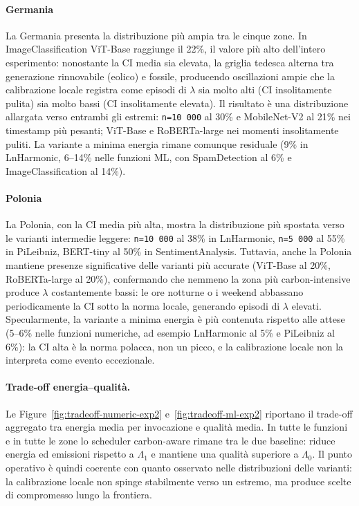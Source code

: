 \paragraph{Germania}
La Germania presenta la distribuzione più ampia tra le cinque zone. In
ImageClassification ViT-Base raggiunge il 22\%, il valore più alto dell'intero
esperimento: nonostante la CI media sia elevata, la griglia tedesca alterna tra
generazione rinnovabile (eolico) e fossile, producendo oscillazioni ampie che la
calibrazione locale registra come episodi di $\lambda$ sia molto alti (CI
insolitamente pulita) sia molto bassi (CI insolitamente elevata). Il risultato è
una distribuzione allargata verso entrambi gli estremi: \texttt{n=10\,000} al
30\% e MobileNet-V2 al 21\% nei timestamp più pesanti; ViT-Base e RoBERTa-large
nei momenti insolitamente puliti. La variante a minima energia rimane comunque
residuale (9\% in LnHarmonic, 6--14\% nelle funzioni ML, con SpamDetection al
6\% e ImageClassification al 14\%).

\paragraph{Polonia}
La Polonia, con la CI media più alta, mostra la distribuzione più
spostata verso le varianti intermedie leggere: \texttt{n=10\,000} al 38\% in
LnHarmonic, \texttt{n=5\,000} al 55\% in PiLeibniz, BERT-tiny al 50\% in
SentimentAnalysis. Tuttavia, anche la Polonia mantiene presenze significative delle
varianti più accurate (ViT-Base al 20\%, RoBERTa-large al 20\%), confermando
che nemmeno la zona più carbon-intensive produce $\lambda$ costantemente bassi:
le ore notturne o i weekend abbassano periodicamente la CI sotto la norma locale,
generando episodi di $\lambda$ elevati. Specularmente, la variante a minima energia
è più contenuta rispetto alle attese (5--6\% nelle funzioni numeriche,
ad esempio LnHarmonic al 5\% e PiLeibniz al 6\%): la CI alta
è la norma polacca, non un picco, e la calibrazione locale non la interpreta come
evento eccezionale.

\paragraph{Trade-off energia--qualità.}
Le Figure~\ref{fig:tradeoff-numeric-exp2} e~\ref{fig:tradeoff-ml-exp2}
riportano il trade-off aggregato tra energia media per invocazione e qualità
media. In tutte le funzioni e in tutte le zone lo scheduler carbon-aware rimane
tra le due baseline: riduce energia ed emissioni rispetto a $\Lambda_1$ e
mantiene una qualità superiore a $\Lambda_0$. Il punto operativo è quindi
coerente con quanto osservato nelle distribuzioni delle varianti: la
calibrazione locale non spinge stabilmente verso un estremo, ma produce scelte
di compromesso lungo la frontiera.

